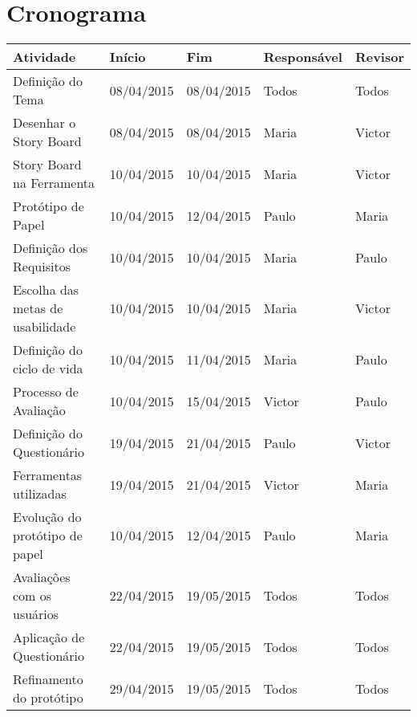 \chapter[Cronograma]{Cronograma}

\begin{table}[h]
	\centering
	\begin{tabular}{@{}lllll@{}}
		\hline
		Atividade                       &    Início    &     Fim    & Responsável & Revisor \\ \hline
		Definição do Tema               &  08/04/2015  & 08/04/2015 & Todos       & Todos \\ \hline	
		Desenhar o Story Board          &  08/04/2015  & 08/04/2015 & Maria       & Victor \\ \hline	
		Story Board na Ferramenta       &  10/04/2015  & 10/04/2015 & Maria       & Victor \\ \hline
		Protótipo de Papel              &  10/04/2015  & 12/04/2015 & Paulo       & Maria \\ \hline	
		Definição dos Requisitos        &  10/04/2015  & 10/04/2015 & Maria       & Paulo \\ \hline	
		Escolha das metas de usabilidade&  10/04/2015  & 10/04/2015 & Maria       & Victor \\ \hline	
		Definição do ciclo de vida    &  10/04/2015  & 11/04/2015 & Maria       & Paulo \\ \hline	
		Processo de Avaliação           &  10/04/2015  & 15/04/2015 & Victor      & Paulo \\ \hline	
		Definição do Questionário     &  19/04/2015  & 21/04/2015 & Paulo       & Victor \\ \hline	
		Ferramentas utilizadas          &  19/04/2015  & 21/04/2015 & Victor      & Maria \\ \hline
		Evolução do protótipo de papel  &  10/04/2015  & 12/04/2015 & Paulo       & Maria \\ \hline
		Avaliações com os usuários      &  22/04/2015  & 19/05/2015 & Todos       & Todos \\ \hline
		Aplicação de Questionário		&  22/04/2015  & 19/05/2015 & Todos		  & Todos \\ \hline	
		Refinamento do protótipo       &  29/04/2015  & 19/05/2015 & Todos       & Todos \\ \hline
		
	\end{tabular}
\end{table}




